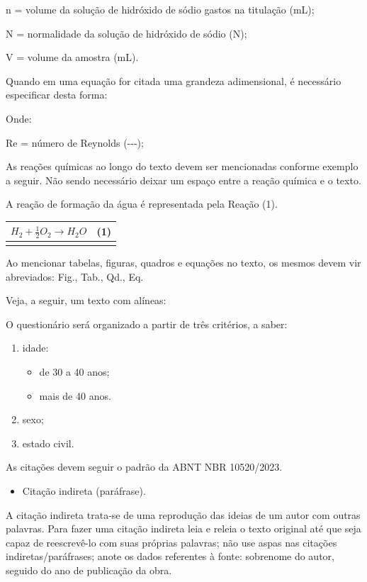 \documentclass[
]{article}
\providecommand{\tightlist}{%
  \setlength{\itemsep}{0pt}\setlength{\parskip}{0pt}}
\begin{document}
n = volume da solução de hidróxido de sódio gastos na titulação (mL);

N = normalidade da solução de hidróxido de sódio (N);

V = volume da amostra (mL).

Quando em uma equação for citada uma grandeza adimensional, é necessário
especificar desta forma:

Onde:

Re = número de Reynolds (-\/-\/-);

As reações químicas ao longo do texto devem ser mencionadas conforme
exemplo a seguir. Não sendo necessário deixar um espaço entre a reação
química e o texto.

A reação de formação da água é representada pela Reação (1).

\begin{longtable}[]{@{}ll@{}}
\toprule\noalign{}
\(H_{2} + \frac{1}{2}O_{2} \rightarrow H_{2}O\) & (1) \\
\midrule\noalign{}
\endhead
\bottomrule\noalign{}
\endlastfoot
\end{longtable}

Ao mencionar tabelas, figuras, quadros e equações no texto, os mesmos
devem vir abreviados: Fig., Tab., Qd., Eq.

Veja, a seguir, um texto com alíneas:

O questionário será organizado a partir de três critérios, a saber:

\begin{enumerate}
\def\labelenumi{\alph{enumi})}
\item
  idade:

  \begin{itemize}
  \item
    de 30 a 40 anos;
  \item
    mais de 40 anos.
  \end{itemize}
\item
  sexo;
\item
  estado civil.
\end{enumerate}

As citações devem seguir o padrão da ABNT NBR 10520/2023.

\begin{itemize}
\tightlist
\item
  Citação indireta (paráfrase).
\end{itemize}

A citação indireta trata-se de uma reprodução das ideias de um autor com
outras palavras. Para fazer uma citação indireta leia e releia o texto
original até que seja capaz de reescrevê-lo com suas próprias palavras;
não use aspas nas citações indiretas/paráfrases; anote os dados
referentes à fonte: sobrenome do autor, seguido do ano de publicação da
obra.
\end{document}
